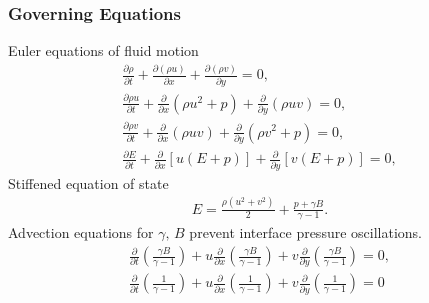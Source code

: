 \begin{frame} \frametitle{\vspace*{0.5cm}Governing Equations}
  \vfil\vspace*{0.5cm}
  {\small
    \hspace*{1cm}Euler equations of fluid motion
  }
  {\scriptsize
    \begin{align*}%
      \frac{\partial \rho}{\partial t} + \frac{\partial \left(\rho u\right)}{\partial x} + \frac{\partial \left(\rho v\right)}{\partial y} = 0,\\
      \frac{\partial \rho u}{\partial t} + \frac{\partial}{\partial x}\left( \rho u^2+p\right)  + \frac{\partial}{\partial y}\left( \rho uv\right) = 0,\\
      \frac{\partial \rho v}{\partial t} + \frac{\partial}{\partial x}\left( \rho uv\right)  + \frac{\partial}{\partial y}\left( \rho v^2+p\right) = 0,\\
      \frac{\partial E}{\partial t} + \frac{\partial}{\partial x}\left[u\left(E+p\right)\right] + \frac{\partial}{\partial y}\left[v\left(E+p\right)\right] = 0,
    \end{align*}%
  }
  \vfil
  {\small
    \hspace*{1cm}Stiffened equation of state
  }
  {\scriptsize
    \begin{align*} \label{eq:stiffened_eos}%
      E=\frac{\rho\left(u^2+v^2\right)}{2} + \frac{p+\gamma B}{\gamma-1}.
    \end{align*}
  }
  \vfil
  {\small
    \hspace*{1cm}Advection equations for $\gamma,\,B$ prevent interface pressure oscillations.
  }
  \scriptsize{
    \begin{align*}
      \frac{\partial}{\partial t}\left(\frac{\gamma B}{\gamma-1}\right)%
      +u\frac{\partial}{\partial x}\left(\frac{\gamma B}{\gamma-1}\right)%
      +v\frac{\partial}{\partial y}\left(\frac{\gamma B}{\gamma-1}\right)%
      = 0,\\%
      \frac{\partial}{\partial t}\left(\frac{1}{\gamma-1}\right)%
      +u\frac{\partial}{\partial x}\left(\frac{1}{\gamma-1}\right)%
      +v\frac{\partial}{\partial y}\left(\frac{1}{\gamma-1}\right)= 0%
    \end{align*}
  }
\end{frame}
